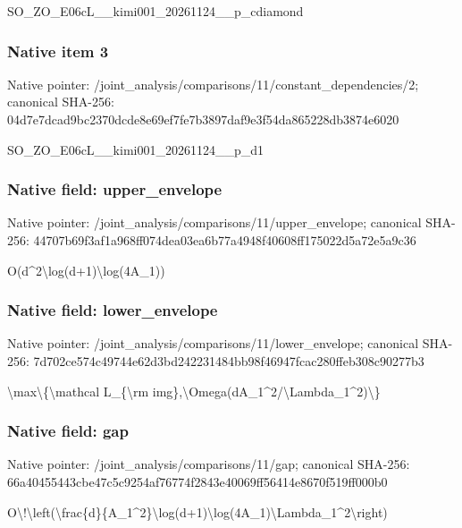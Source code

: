 \documentclass[10pt,a4paper]{article}
\begin{document}
SO\_ZO\_E06cL\_\_kimi001\_202\allowbreak{}61124\_\_p\_cdiamond


\subsubsection{Native item 3}


Native pointer: /joint\_analysis/comparis\allowbreak{}ons/11/constant\_dependen\allowbreak{}cies/2; canonical SHA-256: 04d7e7dcad9bc2370dcde8e6\allowbreak{}9ef7fe7b3897daf9e3f54da8\allowbreak{}65228db3874e6020


SO\_ZO\_E06cL\_\_kimi001\_20261124\_\_p\_d1


\subsubsection{Native field: upper\_envelope}


Native pointer: /joint\_analysis/comparis\allowbreak{}ons/11/upper\_envelope; canonical SHA-256: 44707b69f3af1a968ff074de\allowbreak{}a03ea6b77a4948f40608ff17\allowbreak{}5022d5a72e5a9c36


O(d\textasciicircum{}2\textbackslash{}log(d+1)\textbackslash{}log(4A\_1))


\subsubsection{Native field: lower\_envelope}


Native pointer: /joint\_analysis/comparis\allowbreak{}ons/11/lower\_envelope; canonical SHA-256: 7d702ce574c49744e62d3bd2\allowbreak{}42231484bb98f46947fcac28\allowbreak{}0ffeb308c90277b3


\textbackslash{}max\textbackslash{}\{\textbackslash{}mathcal L\_\{\textbackslash{}rm img\},\textbackslash{}Omega(dA\_1\textasciicircum{}2/\textbackslash{}Lambda\_1\textasciicircum{}2)\textbackslash{}\}


\subsubsection{Native field: gap}


Native pointer: /joint\_analysis/comparisons/11/gap; canonical SHA-256: 66a40455443cbe47c5c9254a\allowbreak{}f76774f2843e40069ff56414\allowbreak{}e8670f519ff000b0


O\textbackslash{}!\textbackslash{}left(\textbackslash{}frac\{d\}\{A\_1\textasciicircum{}2\}\allowbreak{}\textbackslash{}log(d+1)\textbackslash{}log(4A\_1)\textbackslash{}Lamb\allowbreak{}da\_1\textasciicircum{}2\textbackslash{}right)
\end{document}

